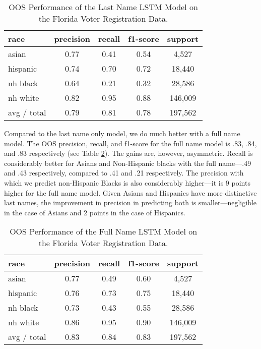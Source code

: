 \documentclass[12pt, letterpaper]{article}
\begin{document}
\begin{table}[h!]
\centering
\caption{OOS Performance of the Last Name LSTM Model on the Florida Voter Registration Data.}
\begin{tabular}{ l c c c c }
\hline    
    race & precision & recall & f1-score & support \\
\hline
      asian &       0.77 &      0.41 &      0.54 &      4,527 \\
   hispanic &       0.74 &      0.70 &      0.72 &     18,440 \\
   nh black &       0.64 &      0.21 &      0.32 &     28,586 \\
   nh white &       0.82 &      0.95 &      0.88 &    146,009 \\

avg / total &       0.79 &      0.81 &      0.78 &    197,562 \\

\hline
\end{tabular}
\label{table:last_name_fl_voter_reg}
\end{table}

Compared to the last name only model, we do much better with a full name model. The OOS precision, recall, and f1-score for the full name model is .83, .84, and .83 respectively (see Table \ref{table:full_name_fl_voter_reg}). The gains are, however, asymmetric. Recall is considerably better for Asians and Non-Hispanic blacks with the full name---.49 and .43 respectively, compared to .41 and .21 respectively. The precision with which we predict non-Hispanic Blacks is also considerably higher---it is 9 points higher for the full name model. Given Asians and Hispanics have more distinctive last names, the improvement in precision in predicting both is smaller---negligible in the case of Asians and 2 points in the case of Hispanics.

\begin{table}[h!]
\centering
\caption{OOS Performance of the Full Name LSTM Model on the Florida Voter Registration Data.}
\begin{tabular}{ l c c c c }
\hline    
   race & precision & recall & f1-score & support\\
\hline
      asian &        0.77 &       0.49 &       0.60 &       4,527\\
   hispanic &        0.76 &       0.73 &       0.75 &      18,440\\
   nh black &        0.73 &       0.43 &       0.55 &      28,586\\
   nh white &        0.86 &       0.95 &       0.90 &     146,009\\

avg / total &        0.83 &       0.84 &       0.83 &     197,562\\
\hline
\end{tabular}
\label{table:full_name_fl_voter_reg}
\end{table}
\end{document}
